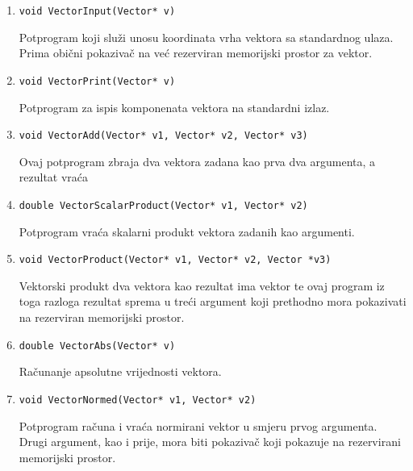 \documentclass[utf8]{fer}
\begin{document}
\begin{enumerate}


\item \begin{lstlisting}
void VectorInput(Vector* v)

\end{lstlisting}
Potprogram koji služi unosu koordinata vrha vektora sa standardnog ulaza. Prima obični pokazivač na već rezerviran memorijski prostor za vektor.

\item \begin{lstlisting}
void VectorPrint(Vector* v)

\end{lstlisting}
Potprogram za ispis komponenata vektora na standardni izlaz.

\item \begin{lstlisting}
void VectorAdd(Vector* v1, Vector* v2, Vector* v3)

\end{lstlisting}
Ovaj potprogram zbraja dva vektora zadana kao prva dva argumenta, a rezultat vraća

\item \begin{lstlisting}
double VectorScalarProduct(Vector* v1, Vector* v2)
\end{lstlisting}
Potprogram vraća skalarni produkt vektora zadanih kao argumenti.

\item \begin{lstlisting}
void VectorProduct(Vector* v1, Vector* v2, Vector *v3)
\end{lstlisting}
Vektorski produkt dva vektora kao rezultat ima vektor te ovaj program iz toga razloga rezultat sprema u treći argument koji prethodno mora pokazivati na rezerviran memorijski prostor.

\item \begin{lstlisting}
double VectorAbs(Vector* v)
\end{lstlisting}
Računanje apsolutne vrijednosti vektora.

\item \begin{lstlisting}
void VectorNormed(Vector* v1, Vector* v2)
\end{lstlisting}

Potprogram računa i vraća normirani vektor u smjeru prvog argumenta. Drugi argument, kao i prije, mora biti pokazivač koji pokazuje na rezervirani memorijski prostor.

\end{enumerate}
\end{document}
